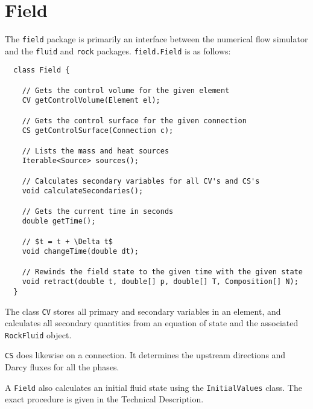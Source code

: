 \chapter{Field}
\label{chap:field}

\minitoc

The \texttt{field} package is primarily an interface between the
numerical flow simulator and the \texttt{fluid} and \texttt{rock}
packages. \texttt{field.Field} is as follows:
\begin{lstlisting}
  class Field {

    // Gets the control volume for the given element
    CV getControlVolume(Element el);

    // Gets the control surface for the given connection
    CS getControlSurface(Connection c);

    // Lists the mass and heat sources
    Iterable<Source> sources();

    // Calculates secondary variables for all CV's and CS's
    void calculateSecondaries();

    // Gets the current time in seconds
    double getTime();

    // $t = t + \Delta t$
    void changeTime(double dt);

    // Rewinds the field state to the given time with the given state
    void retract(double t, double[] p, double[] T, Composition[] N);
  }
\end{lstlisting}

The class \texttt{CV} stores all primary and secondary variables in an
element, and calculates all secondary quantities from an equation of
state and the associated \texttt{RockFluid} object.

\texttt{CS} does likewise on a connection. It determines the upstream
directions and Darcy fluxes for all the phases.

A \texttt{Field} also calculates an initial fluid state using the
\texttt{InitialValues} class. The exact procedure is given in the
Technical Description.

